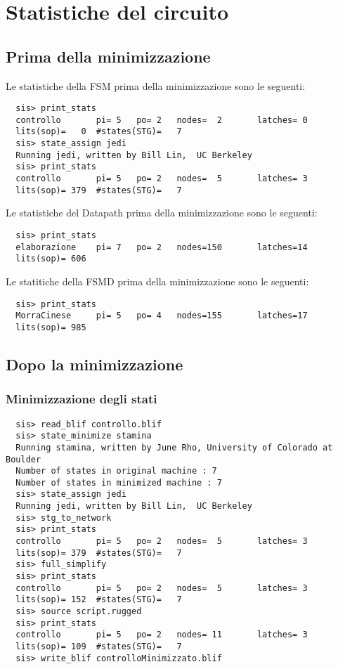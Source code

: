 \documentclass[a4paper]{article}
\begin{document}
\section{Statistiche del circuito}

\subsection{Prima della minimizzazione}
Le statistiche della FSM prima della minimizzazione sono le seguenti:
\begin{lstlisting}
  sis> print_stats
  controllo       pi= 5   po= 2   nodes=  2       latches= 0
  lits(sop)=   0  #states(STG)=   7
  sis> state_assign jedi
  Running jedi, written by Bill Lin,  UC Berkeley
  sis> print_stats
  controllo       pi= 5   po= 2   nodes=  5       latches= 3
  lits(sop)= 379  #states(STG)=   7
\end{lstlisting}

\noindent Le statistiche del Datapath prima della minimizzazione sono le seguenti:
\begin{lstlisting}
  sis> print_stats
  elaborazione    pi= 7   po= 2   nodes=150       latches=14
  lits(sop)= 606
\end{lstlisting}

\noindent Le statitiche della FSMD prima della minimizzazione sono le seguenti:
\begin{lstlisting}
  sis> print_stats
  MorraCinese     pi= 5   po= 4   nodes=155       latches=17
  lits(sop)= 985
\end{lstlisting}

\subsection{Dopo la minimizzazione}

\subsubsection{Minimizzazione degli stati}
\begin{lstlisting}
  sis> read_blif controllo.blif
  sis> state_minimize stamina
  Running stamina, written by June Rho, University of Colorado at Boulder
  Number of states in original machine : 7
  Number of states in minimized machine : 7
  sis> state_assign jedi
  Running jedi, written by Bill Lin,  UC Berkeley
  sis> stg_to_network
  sis> print_stats
  controllo       pi= 5   po= 2   nodes=  5       latches= 3
  lits(sop)= 379  #states(STG)=   7
  sis> full_simplify
  sis> print_stats
  controllo       pi= 5   po= 2   nodes=  5       latches= 3
  lits(sop)= 152  #states(STG)=   7
  sis> source script.rugged
  sis> print_stats
  controllo       pi= 5   po= 2   nodes= 11       latches= 3
  lits(sop)= 109  #states(STG)=   7
  sis> write_blif controlloMinimizzato.blif
\end{lstlisting}
\end{document}
